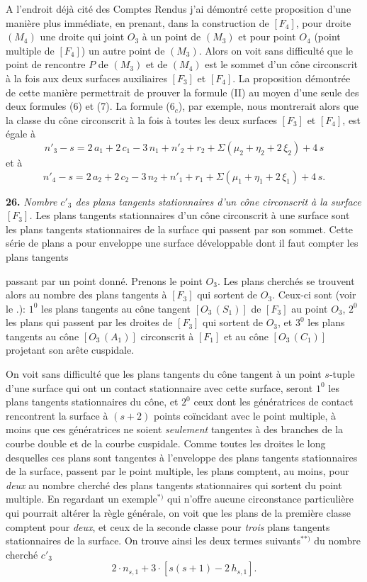 \documentclass{article}
\begin{document}
A l'endroit déjà cité des Comptes Rendus j'ai démontré cette proposition d'une manière plus immédiate, en prenant, dans la construction de $[F_4]$, pour droite $(M_4)$ une droite qui joint $O_3$ à un point de $(M_3)$ et pour point $O_4$ (point multiple de $[F_4]$) un autre point de $(M_3)$. Alors on voit sans difficulté que le point de rencontre $P$ de $(M_3)$ et de $(M_4)$ est le sommet d'un cône circonscrit à la fois aux deux surfaces auxiliaires $[F_3]$ et $[F_4]$. La proposition démontrée de cette manière permettrait de prouver la formule (II) au moyen d'une seule des deux formules (6) et (7). La formule ($6_c$), par exemple, nous montrerait alors que la classe du cône circonscrit à la fois à toutes les deux surfaces $[F_3]$ et $[F_4]$, est égale à
\[
n'_3 - s = 2\,a_1 + 2\,c_1 - 3\,n_1 + n'_2 + r_2 + \Sigma(\mu_2 + \eta_2 + 2\,\xi_2) + 4\,s
\]
et à
\[
n'_4 - s = 2\,a_2 + 2\,c_2 - 3\,n_2 + n'_1 + r_1 + \Sigma(\mu_1 + \eta_1 + 2\,\xi_1) + 4\,s.
\]

\textbf{26.} \emph{Nombre $c'_3$ des plans tangents stationnaires d'un cône circonscrit à la surface $[F_3]$.} Les plans tangents stationnaires d'un cône circonscrit à une surface sont les plans tangents stationnaires de la surface qui passent par son sommet. Cette série de plans a pour enveloppe une surface développable dont il faut compter les plans tangents

passant par un point donné. Prenons le point $O_3$. Les plans cherchés se trouvent alors au nombre des plans tangents à $[F_3]$ qui sortent de $O_3$. Ceux-ci sont (voir le .): $1^0$ les plans tangents au cône tangent $[O_3\,(S_1)]$ de $[F_3]$ au point $O_3$, $2^0$ les plans qui passent par les droites de $[F_3]$ qui sortent de $O_3$, et $3^0$ les plans tangents au cône $[O_3\,(A_1)]$ circonscrit à $[F_1]$ et au cône $[O_3\,(C_1)]$ projetant son arête cuspidale.

On voit sans difficulté que les plans tangents du cône tangent à un point $s$-tuple d'une surface qui ont un contact stationnaire avec cette surface, seront $1^0$ les plans tangents stationnaires du cône, et $2^0$ ceux dont les génératrices de contact rencontrent la surface à $(s + 2)$ points coïncidant avec le point multiple, à moins que ces génératrices ne soient \emph{seulement} tangentes à des branches de la courbe double et de la courbe cuspidale. Comme toutes les droites le long desquelles ces plans sont tangentes à l'enveloppe des plans tangents stationnaires de la surface, passent par le point multiple, les plans comptent, au moins, pour \emph{deux} au nombre cherché des plans tangents stationnaires qui sortent du point multiple. En regardant un exemple${}^{*)}$ qui n'offre aucune circonstance particulière qui pourrait altérer la règle générale, on voit que les plans de la première classe comptent pour \emph{deux}, et ceux de la seconde classe pour \emph{trois} plans tangents stationnaires de la surface. On trouve ainsi les deux termes suivants${}^{**)}$ du nombre cherché $c'_3$
\[
2\cdot n_{s, 1} + 3\cdot [s(s + 1) - 2\,h_{s, 1}].
\]
\end{document}
